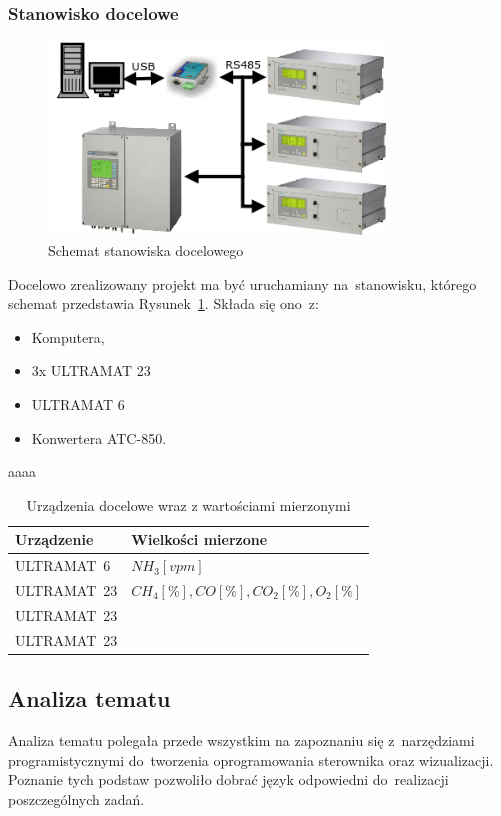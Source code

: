 \subsubsection{Stanowisko docelowe}
\begin{figure}[!htb] 	\centering 	\includegraphics[width=0.8\textwidth]{images/schemat2} 	\caption{Schemat stanowiska docelowego} \label{schemat2} \end{figure} 
Docelowo zrealizowany projekt ma być uruchamiany na~stanowisku, którego schemat przedstawia Rysunek~\ref{schemat2}. Składa się ono~z:
\begin{itemize}
\item Komputera,
\item 3x ULTRAMAT 23
\item ULTRAMAT 6
\item Konwertera ATC-850.
\end{itemize}
\indent
\indent aaaa

\begin{table}[h]
\centering
\begin{tabular}{|l|l|}
\hline Urządzenie & Wielkości mierzone \\ 
\hline ULTRAMAT~6 & $ NH_3 [vpm] $ \\ 
\hline ULTRAMAT~23 & $ CH_4 [\%], CO [\%], CO_2 [\%], O_2 [\%] $ \\ 
\hline ULTRAMAT~23 & $  $ \\ 
\hline ULTRAMAT~23 & $  $ \\ 
\hline 
\end{tabular} 
\caption{Urządzenia docelowe wraz z wartościami mierzonymi}
\label{tab:docelowe}
\end{table}

\subsection{Analiza tematu}
Analiza tematu polegała przede wszystkim na zapoznaniu się z~narzędziami programistycznymi do~tworzenia oprogramowania sterownika oraz wizualizacji.
Poznanie tych podstaw pozwoliło dobrać język odpowiedni do~realizacji poszczególnych zadań.

